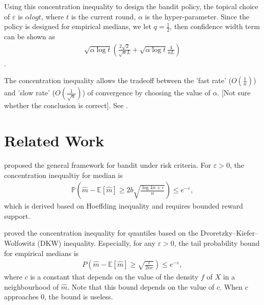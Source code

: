 \documentclass{article}
\theoremstyle{plain}
\begin{document}
Using this concentration inequality to design the bandit policy, the topical choice of $\varepsilon$ is $\alpha log t$, where $t$ is the current round, $\alpha$ is the hyper-parameter. Since the policy is designed for empirical medians, we let $q = \frac{1}{2}$, then confidence width term can be shown as 
\begin{align}
    \sqrt{\alpha \log t} \left( \frac{2\sqrt{2}}{\sqrt{n}L} + \sqrt{\alpha \log t} \frac{4}{nL}\right)
\end{align}.

The concentration inequality allows the tradeoff between the 'fast rate' ($O(\frac{1}{n})$) and 'slow rate' ($O(\frac{1}{\sqrt{n}})$) of convergence by choosing the value of $\alpha$. [Not sure whether the conclusion is correct]. See \cite{van2015fast}.

\section{Related Work}

\textcite{cassel_general_2018} proposed the general framework for bandit under risk criteria. For $\varepsilon > 0$, the concentration inequaltiy for median is 
\begin{align}
    \mathbb{P}\left(\hat{m} - \mathbb{E}[\hat{m}] \geq 2b \sqrt{\frac{\log 4n + \varepsilon}{n}}\right) \leq  e^{- \varepsilon},
\end{align}
which is derived based on Hoeffding inequality and requires bounded reward support.

\textcite{kolla_concentration_2019} proved the concentration inequality for quantiles based on the Dvoretzky–Kiefer–Wolfowitz (DKW) inequality. Especially, for any $\varepsilon >0$,  the tail probability bound for empirical medians is 
\begin{align}
\label{equ: Concentration inequality for quantiles based on DKW}
    P \left(\hat{m} - \mathbb{E}[\hat{m}] \geq \sqrt{\frac{\varepsilon}{2nc}}\right) \leq e^{- \varepsilon},
\end{align}
where $c$ is a constant that depends on the value of the density $f$ of $X$ in a neighbourhood of $\hat{m}$.
Note that this bound depends on the value of $c$. When $c$ approaches 0, the bound is useless.
\end{document}
